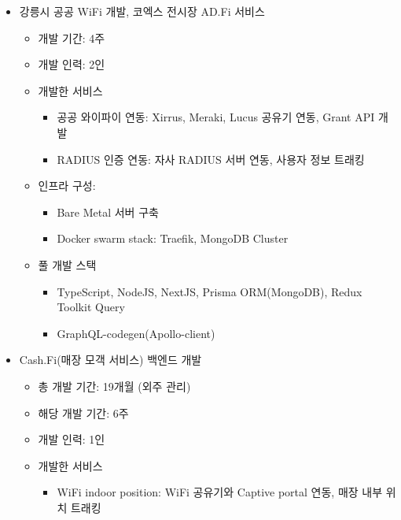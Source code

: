 \begin{itemize}[label=]
\begin{itemize}[label=]
		      \item 강릉시 공공 WiFi 개발, 코엑스 전시장 AD.Fi 서비스 \hyperref[publicadfi]{\space {}}
		            \begin{itemize}[label=]
			            \item 개발 기간: 4주
			            \item 개발 인력: 2인
			            \item 개발한 서비스
			                  \begin{itemize}
				                  \item 공공 와이파이 연동: Xirrus, Meraki, Lucus 공유기 연동, Grant API 개발
				                  \item RADIUS 인증 연동: 자사 RADIUS 서버 연동, 사용자 정보 트래킹
			                  \end{itemize}
			            \item 인프라 구성:
			                  \begin{itemize}
				                  \item Bare Metal 서버 구축
				                  \item Docker swarm stack: Traefik, MongoDB Cluster
			                  \end{itemize}
			            \item 풀 개발 스택
			                  \begin{itemize}
				                  \item TypeScript, NodeJS, NextJS, Prisma ORM(MongoDB), Redux Toolkit Query
				                  \item GraphQL-codegen(Apollo-client)
			                  \end{itemize}
		            \end{itemize}
		      \item Cash.Fi(매장 모객 서비스) 백엔드 개발 \hyperref[cashfi]{\space {}}
		            \begin{itemize}[label=]
			            \item 총 개발 기간: 19개월 (외주 관리)
			            \item 해당 개발 기간: 6주
			            \item 개발 인력: 1인
			            \item 개발한 서비스
			                  \begin{itemize}
				                  \item WiFi indoor position: WiFi 공유기와 Captive portal 연동, 매장 내부 위치 트래킹

\end{itemize}
\end{itemize}
\end{itemize}
\end{itemize}
